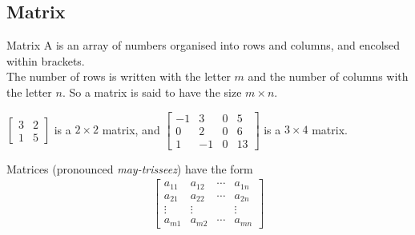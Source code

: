 \documentclass[../notes.tex]{subfiles}
\begin{document}
			\subsection{Matrix}
				\begin{definition}{Matrix}
					A  is an array of numbers organised into rows and columns, and encolsed within brackets.\\
					The number of rows is written with the letter $m$ and the number of columns with the letter $n$. So a matrix is said to have the size $m \times n$.
				\end{definition}
				\begin{example}[hbox]
					$\begin{bmatrix}
						3 & 2\\
						1 & 5
					\end{bmatrix}$ is a $2 \times 2$ matrix, and
					$\begin{bmatrix}
						-1 & 3 & 0 & 5\\
						0 & 2 & 0 & 6\\
						1 & - 1& 0 & 13
					\end{bmatrix}$ is a $3 \times 4$ matrix.
				\end{example}
				Matrices (pronounced \emph{may-trisseez}) have the form 
				\begin{align*}
					\begin{bmatrix}
						a_{11} & a_{12} & \cdots & a_{1n}\\
						a_{21} & a_{22} & \cdots & a_{2n}\\
						\vdots & \vdots & & \vdots\\
						a_{m1} & a_{m2} & \cdots & a_{mn}
					\end{bmatrix}
				\end{align*}
\end{document}
